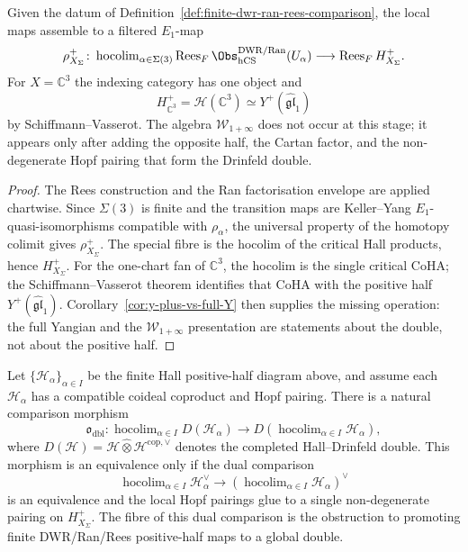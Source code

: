 \begin{proposition}
\label{prop:finite-comparison-positive-half}
Given the datum of Definition~\ref{def:finite-dwr-ran-rees-comparison},
the local maps assemble to a filtered $E_1$-map
\[
 \rho^+_{X_\Sigma}\colon
 \operatorname{hocolim}_{\alpha\in\Sigma(3)}
 \operatorname{Rees}_F\Obs^{\mathrm{DWR/Ran}}_{\hCS}(U_\alpha)
 \longrightarrow
 \operatorname{Rees}_F H^+_{X_\Sigma}.
\]
For $X=\mathbb{C}^3$ the indexing category has one object and
\[
 H^+_{\mathbb{C}^3}
 =
 \mathcal{H}(\mathbb{C}^3)
 \simeq
 Y^+(\widehat{\mathfrak{gl}}_1)
\]
by Schiffmann--Vasserot. The algebra
$\mathcal{W}_{1+\infty}$ does not occur at this stage; it appears only
after adding the opposite half, the Cartan factor, and the
non-degenerate Hopf pairing that form the Drinfeld double.
\end{proposition}

\begin{proof}
The Rees construction and the Ran factorisation envelope are applied
chartwise. Since $\Sigma(3)$ is finite and the transition maps are
Keller--Yang $E_1$-quasi-isomorphisms compatible with $\rho_\alpha$,
the universal property of the homotopy colimit gives
$\rho^+_{X_\Sigma}$. The special fibre is the hocolim of the critical
Hall products, hence $H^+_{X_\Sigma}$. For the one-chart fan of
$\mathbb{C}^3$, the hocolim is the single critical CoHA; the
Schiffmann--Vasserot theorem identifies that CoHA with the positive
half $Y^+(\widehat{\mathfrak{gl}}_1)$. Corollary~\ref{cor:y-plus-vs-full-Y}
then supplies the missing operation: the full Yangian and the
$\mathcal{W}_{1+\infty}$ presentation are statements about the double,
not about the positive half.
\end{proof}

\begin{theorem}
\label{thm:finite-positive-half-double-obstruction}
Let $\{\mathcal{H}_\alpha\}_{\alpha\in I}$ be the finite Hall
positive-half diagram above, and assume each $\mathcal{H}_\alpha$
has a compatible coideal coproduct and Hopf pairing. There is a natural
comparison morphism
\[
 \mathfrak{o}_{\mathrm{dbl}}\colon
 \operatorname{hocolim}_{\alpha\in I}D(\mathcal{H}_\alpha)
 \longrightarrow
 D\!\left(\operatorname{hocolim}_{\alpha\in I}\mathcal{H}_\alpha\right),
\]
where
$D(\mathcal{H})=\mathcal{H}\widehat{\otimes}\mathcal{H}^{\mathrm{cop},\vee}$
denotes the completed Hall--Drinfeld double. This morphism is an
equivalence only if the dual comparison
\[
 \operatorname{hocolim}_{\alpha\in I}\mathcal{H}_\alpha^{\vee}
 \longrightarrow
 \left(\operatorname{hocolim}_{\alpha\in I}\mathcal{H}_\alpha\right)^{\vee}
\]
is an equivalence and the local Hopf pairings glue to a single
non-degenerate pairing on $H^+_{X_\Sigma}$. The fibre of this dual
comparison is the obstruction to promoting finite DWR/Ran/Rees
positive-half maps to a global double.
\end{theorem}

